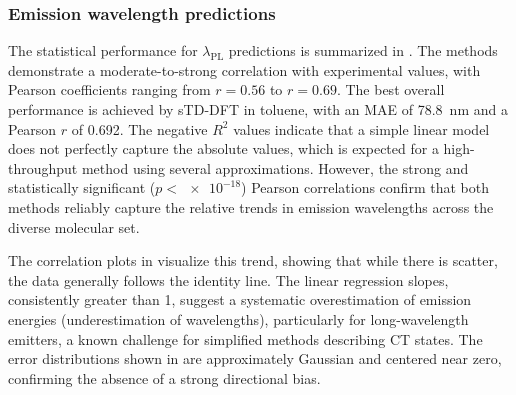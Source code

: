 \documentclass[journal=jcisd8,manuscript=article,keywords=true]{achemso}
\begin{document}

\subsubsection{Emission wavelength predictions}

The statistical performance for $\lambda_{\text{PL}}$ predictions is summarized in
. The methods demonstrate a moderate-to-strong
correlation with experimental values, with Pearson coefficients ranging from $r =
\num{0.56}$ to $r = \num{0.69}$. The best overall performance is achieved by sTD-DFT in
toluene, with an MAE of \qty{78.8}{\nano\meter} and a Pearson $r$ of \num{0.692}. The
negative $R^2$ values indicate that a simple linear model does not perfectly capture the
absolute values, which is expected for a high-throughput method using several
approximations. However, the strong and statistically significant ($p < \num{e-18}$)
Pearson correlations confirm that both methods reliably capture the relative trends in
emission wavelengths across the diverse molecular set.

The correlation plots in  visualize this trend, showing that while there
is scatter, the data generally follows the identity line. The linear regression slopes,
consistently greater than 1, suggest a systematic overestimation of emission energies
(underestimation of wavelengths), particularly for long-wavelength emitters, a known
challenge for simplified methods describing CT states. The error distributions shown in
 are approximately Gaussian and centered near zero, confirming the
absence of a strong directional bias.
\end{document}
